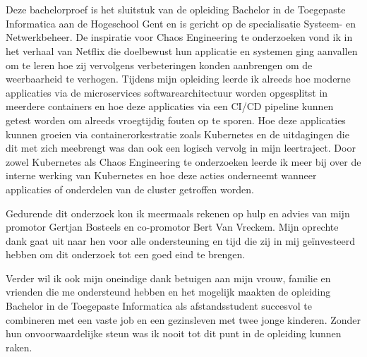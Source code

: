 
\chapter*{}
\label{ch:voorwoord}


Deze bachelorproef is het sluitstuk van de opleiding Bachelor in de Toegepaste Informatica aan de Hogeschool Gent en is gericht op de specialisatie Systeem- en Netwerkbeheer. De inspiratie voor Chaos Engineering te onderzoeken vond ik in het verhaal van Netflix die doelbewust hun applicatie en systemen ging aanvallen om te leren hoe zij vervolgens verbeteringen konden aanbrengen om de weerbaarheid te verhogen. Tijdens mijn opleiding leerde ik alreeds hoe moderne applicaties via de microservices softwarearchitectuur worden opgesplitst in meerdere containers en hoe deze applicaties via een CI/CD pipeline kunnen getest worden om alreeds vroegtijdig fouten op te sporen. Hoe deze applicaties kunnen groeien via containerorkestratie zoals Kubernetes en de uitdagingen die dit met zich meebrengt was dan ook een logisch vervolg in mijn leertraject. Door zowel Kubernetes als Chaos Engineering te onderzoeken leerde ik meer bij over de interne werking van Kubernetes en hoe deze acties onderneemt wanneer applicaties of onderdelen van de cluster getroffen worden. 

Gedurende dit onderzoek kon ik meermaals rekenen op hulp en advies van mijn promotor Gertjan Bosteels en co-promotor Bert Van Vreckem. Mijn oprechte dank gaat uit naar hen voor alle ondersteuning en tijd die zij in mij geïnvesteerd hebben om dit onderzoek tot een goed eind te brengen.

Verder wil ik ook mijn oneindige dank betuigen aan mijn vrouw, familie en vrienden die me ondersteund hebben en het mogelijk maakten de opleiding Bachelor in de Toegepaste Informatica als afstandsstudent succesvol te combineren met een vaste job en een gezinsleven met twee jonge kinderen. Zonder hun onvoorwaardelijke steun was ik nooit tot dit punt in de opleiding kunnen raken.      